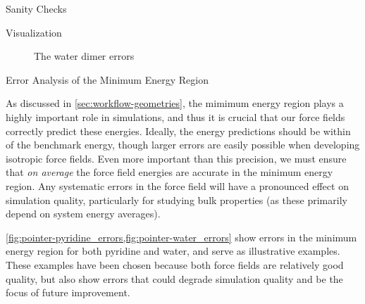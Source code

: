 \begin{subsection}{Sanity Checks}
\begin{paragraph}{Visualization}
\begin{figure}
\centering
{}
\caption[Errors with the water dimer]
{The water dimer errors}
\label{fig:pointer-water_errors}
\end{figure}

\end{paragraph}


\begin{paragraph}{Error Analysis of the Minimum Energy Region}

As discussed in \cref{sec:workflow-geometries}, the mimimum energy region
plays a highly important role in simulations, and thus it is crucial that our
force fields correctly predict these energies. Ideally, the energy predictions
should be within  of the benchmark energy, though larger errors
are easily possible when developing isotropic force fields. Even more
important than this precision, we must ensure that \emph{on average} the force
field energies are accurate in the minimum energy region. Any systematic
errors in the force field will have a pronounced effect on simulation quality,
particularly for studying bulk properties (as these primarily depend on system
energy averages). 

\cref{fig:pointer-pyridine_errors,fig:pointer-water_errors} show errors in the minimum
energy region for both pyridine and water, and serve as illustrative examples.
These examples have been chosen because both force fields are relatively good quality, but also show errors that could
degrade simulation quality and be the focus of future improvement. 


\end{paragraph}
\end{subsection}
